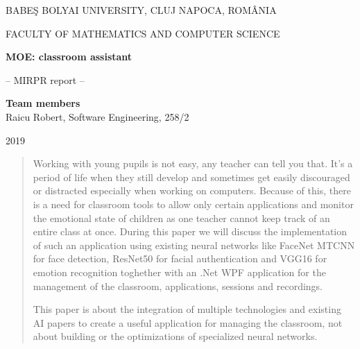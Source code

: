 \documentclass[runningheads,a4paper,11pt]{report}
\begin{document}
\begin{titlepage}
\sloppy
\begin{center}
BABE\c S BOLYAI UNIVERSITY, CLUJ NAPOCA, ROM\^ ANIA

FACULTY OF MATHEMATICS AND COMPUTER SCIENCE

\vspace{6cm}

\Huge \textbf{MOE: classroom assistant}

\vspace{1cm}

\normalsize -- MIRPR report --

\end{center}


\vspace{5cm}

\begin{flushright}
\Large{\textbf{Team members}}\\
Raicu Robert, Software Engineering, 258/2
\end{flushright}

\vspace{4cm}

\begin{center}
2019
\end{center}

\end{titlepage}


\begin{abstract}

    Working with young pupils is not easy, any teacher can tell you that. It's a period of life when they still develop and sometimes get easily discouraged or distracted especially when working on computers. Because of this, there is a need for classroom tools to allow only certain applications and monitor the emotional state of children as one teacher cannot keep track of an entire class at once.
    During this paper we will discuss the implementation of such an application using existing neural networks like FaceNet MTCNN \cite{SchroffKP15} for face detection, ResNet50  \cite{HeZRS15} for facial authentication and VGG16 \cite{VGG} for emotion recognition toghether with an .Net WPF application for the management of the classroom, applications, sessions and recordings.

    This paper is about the integration of multiple technologies and existing AI papers to create a useful application for managing the classroom, not about building or the optimizations of specialized neural networks. 
\end{abstract}
\end{document}
